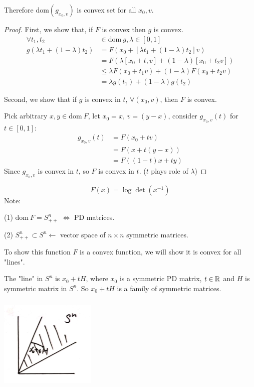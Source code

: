 Therefore $\text{dom}(g_{x_0, v})$ is convex set for all $x_0, v$.

\begin{proof}
First, we show that, if $F$ is convex then $g$ is convex. 
\begin{align*}
\forall t_1, t_2&\in \text{dom}\ g, \lambda\in [0,1]\\
g(\lambda t_1 +(1-\lambda)t_2) &= F(x_0+[\lambda t_1+(1-\lambda)t_2]v)\\
&= F(\lambda[x_0 +t, v]+(1-\lambda)[x_0+t_2v])\\
&\leq \lambda F(x_0+t_1 v)+(1-\lambda)F(x_0+t_2v)\\
&=\lambda g(t_1) + (1-\lambda)g(t_2)
\end{align*}

Second, we show that if $g$ is convex in $t$, $\forall(x_0, v)$, then $F$ is convex. 

Pick arbitrary $x,y\in \text{dom}\ F$, let $x_0 =x$, $v=(y-x)$, consider $g_{x_0, v}(t)$ for $t\in[0,1]$:
\begin{align*}
g_{x_0, v}(t) &= F(x_0+tv)\\
&= F(x+t(y-x))\\
&= F((1-t)x+ty)
\end{align*}
Since $g_{x_0, v}$ is convex in $t$, so $F$ is convex in $t$. ($t$ plays role of $\lambda$)

\end{proof}




\begin{example}
\begin{equation*}
F(x) =\log\det (x^{-1})
\end{equation*}
Note:

(1) $\text{dom}\ F = S^n_{++}$ $\Leftrightarrow$ PD matrices.

(2) $S^n_{++} \subset S^n \leftarrow$ vector space of $n\times n$ symmetric matrices. 

To show this function $F$ is a convex function, we will show it is convex for all "lines".

The "line" in $S^n$ is $x_0 + tH$, where $x_0$ is a symmetric PD matrix, $t\in \mathbb{R}$ and $H$ is symmetric matrix in $S^n$. So $x_0 + tH$ is a family of symmetric matrices.

\begin{marginfigure}
	\centering
	\includegraphics[width=1.8in,height=1.8in]{figures/ch08/figure1104_3.png}
\end{marginfigure}
\end{example}

